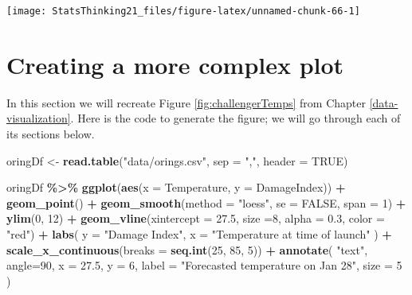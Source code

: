 \documentclass[
  12pt,
]{book}
\newenvironment{Shaded}{\begin{snugshade}}{\end{snugshade}}
\newcommand{\AttributeTok}[1]{\textcolor[rgb]{0.13,0.29,0.53}{#1}}
\newcommand{\ConstantTok}[1]{\textcolor[rgb]{0.56,0.35,0.01}{#1}}
\newcommand{\DecValTok}[1]{\textcolor[rgb]{0.00,0.00,0.81}{#1}}
\newcommand{\FloatTok}[1]{\textcolor[rgb]{0.00,0.00,0.81}{#1}}
\newcommand{\FunctionTok}[1]{\textcolor[rgb]{0.13,0.29,0.53}{\textbf{#1}}}
\newcommand{\NormalTok}[1]{#1}
\newcommand{\OtherTok}[1]{\textcolor[rgb]{0.56,0.35,0.01}{#1}}
\newcommand{\SpecialCharTok}[1]{\textcolor[rgb]{0.81,0.36,0.00}{\textbf{#1}}}
\newcommand{\StringTok}[1]{\textcolor[rgb]{0.31,0.60,0.02}{#1}}
\begin{document}
\texttt{[image: StatsThinking21\_files/figure-latex/unnamed-chunk-66-1]}

\hypertarget{creating-a-more-complex-plot}{%
\section{Creating a more complex plot}\label{creating-a-more-complex-plot}}

In this section we will recreate Figure \ref{fig:challengerTemps} from Chapter \ref{data-visualization}. Here is the code to generate the figure; we will go through each of its sections below.

\begin{Shaded}
\begin{Highlighting}[]
\NormalTok{oringDf }\OtherTok{\textless{}{-}} \FunctionTok{read.table}\NormalTok{(}\StringTok{"data/orings.csv"}\NormalTok{, }\AttributeTok{sep =} \StringTok{","}\NormalTok{,}
                      \AttributeTok{header =} \ConstantTok{TRUE}\NormalTok{)}

\NormalTok{oringDf }\SpecialCharTok{\%\textgreater{}\%}
  \FunctionTok{ggplot}\NormalTok{(}\FunctionTok{aes}\NormalTok{(}\AttributeTok{x =}\NormalTok{ Temperature, }\AttributeTok{y =}\NormalTok{ DamageIndex)) }\SpecialCharTok{+}
  \FunctionTok{geom\_point}\NormalTok{() }\SpecialCharTok{+}
  \FunctionTok{geom\_smooth}\NormalTok{(}\AttributeTok{method =} \StringTok{"loess"}\NormalTok{,}
              \AttributeTok{se =} \ConstantTok{FALSE}\NormalTok{, }\AttributeTok{span =} \DecValTok{1}\NormalTok{) }\SpecialCharTok{+} 
  \FunctionTok{ylim}\NormalTok{(}\DecValTok{0}\NormalTok{, }\DecValTok{12}\NormalTok{) }\SpecialCharTok{+}
  \FunctionTok{geom\_vline}\NormalTok{(}\AttributeTok{xintercept =} \FloatTok{27.5}\NormalTok{, }\AttributeTok{size =}\DecValTok{8}\NormalTok{, }
             \AttributeTok{alpha =} \FloatTok{0.3}\NormalTok{, }\AttributeTok{color =} \StringTok{"red"}\NormalTok{) }\SpecialCharTok{+}
  \FunctionTok{labs}\NormalTok{(}
    \AttributeTok{y =} \StringTok{"Damage Index"}\NormalTok{,}
    \AttributeTok{x =} \StringTok{"Temperature at time of launch"}
\NormalTok{  ) }\SpecialCharTok{+}
  \FunctionTok{scale\_x\_continuous}\NormalTok{(}\AttributeTok{breaks =} \FunctionTok{seq.int}\NormalTok{(}\DecValTok{25}\NormalTok{, }\DecValTok{85}\NormalTok{, }\DecValTok{5}\NormalTok{)) }\SpecialCharTok{+}
  \FunctionTok{annotate}\NormalTok{(}
    \StringTok{"text"}\NormalTok{,}
    \AttributeTok{angle=}\DecValTok{90}\NormalTok{,}
    \AttributeTok{x =} \FloatTok{27.5}\NormalTok{,}
    \AttributeTok{y =} \DecValTok{6}\NormalTok{,}
    \AttributeTok{label =} \StringTok{"Forecasted temperature on Jan 28"}\NormalTok{,}
    \AttributeTok{size =} \DecValTok{5}
\NormalTok{  )}
\end{Highlighting}
\end{Shaded}
\end{document}
